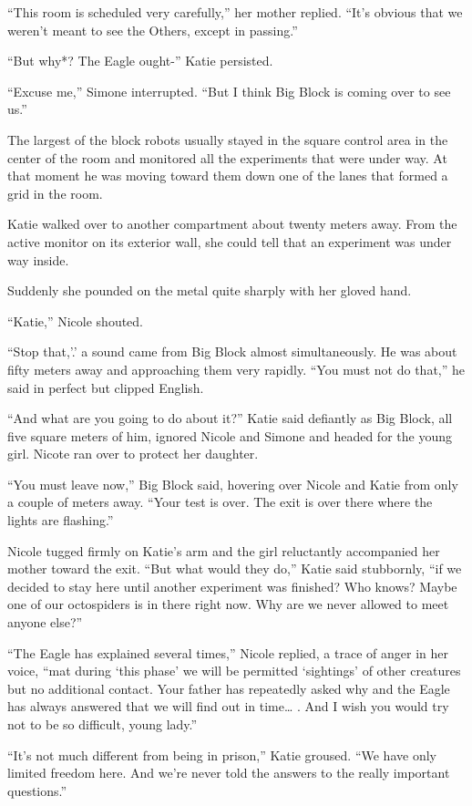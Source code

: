 \documentclass[]{article}
\begin{document}
{“This room is scheduled very carefully,” her mother replied. “It’s obvious that we weren’t meant to see the Others, except in passing.”

“But why*? The Eagle ought-” Katie persisted.

“Excuse me,” Simone interrupted. “But I think Big Block is coming over to see us.”

The largest of the block robots usually stayed in the square control area in the center of the room and monitored all the experiments that were under way. At that moment he was moving toward them down one of the lanes that formed a grid in the room.

Katie walked over to another compartment about twenty meters away. From the active monitor on its exterior wall, she could tell that an experiment was under way inside.

Suddenly she pounded on the metal quite sharply with her gloved hand.

“Katie,” Nicole shouted.

“Stop that,’.’ a sound came from Big Block almost simultaneously. He was about fifty meters away and approaching them very rapidly. “You must not do that,” he said in perfect but clipped English.

“And what are you going to do about it?” Katie said defiantly as Big Block, all five square meters of him, ignored Nicole and Simone and headed for the young girl. Nicote ran over to protect her daughter.

“You must leave now,” Big Block said, hovering over Nicole and Katie from only a couple of meters away. “Your test is over. The exit is over there where the lights are flashing.”

Nicole tugged firmly on Katie’s arm and the girl reluctantly accompanied her mother toward the exit. “But what would they do,” Katie said stubbornly, “if we decided to stay here until another experiment was finished? Who knows? Maybe one of our octospiders is in there right now. Why are we never allowed to meet anyone else?”

“The Eagle has explained several times,” Nicole replied, a trace of anger in her voice, “mat during ‘this phase’ we will be permitted ‘sightings’ of other creatures but no additional contact. Your father has repeatedly asked why and the Eagle has always answered that we will find out in time… . And I wish you would try not to be so difficult, young lady.”

“It’s not much different from being in prison,” Katie groused. “We have only limited freedom here. And we’re never told the answers to the really important questions.”

}
\end{document}
